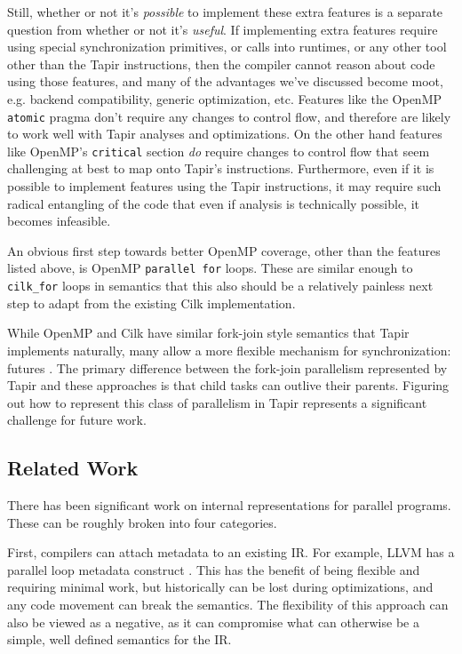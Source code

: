 \documentclass[sigconf]{acmart}
\begin{document}
Still, whether or not it's \emph{possible} to implement these extra features
is a separate question from whether or not it's \emph{useful}. If implementing
extra features require using special synchronization primitives, or calls into
runtimes, or any other tool other than the Tapir instructions, then the
compiler cannot reason about code using those features, and many of the
advantages we've discussed become moot, e.g. backend compatibility, generic 
optimization, etc. Features like the OpenMP \texttt{atomic} pragma don't 
require any changes to control flow, and therefore are likely to work well 
with Tapir analyses and optimizations. On the other hand features like OpenMP's
\texttt{critical} section \emph{do} require changes to control flow that seem
challenging at best to map onto Tapir's instructions. Furthermore, even if it
is possible to implement features using the Tapir instructions, it may require 
such radical entangling of the code that even if analysis is technically
possible, it becomes infeasible. 

An obvious first step towards better OpenMP coverage, other than the features
listed above, is OpenMP \texttt{parallel for} loops. These are similar enough
to \texttt{cilk\_for} loops in semantics that this also should be a relatively
painless next step to adapt from the existing Cilk implementation. 

While OpenMP and Cilk have similar fork-join style semantics that Tapir
implements naturally, many allow a more flexible mechanism for synchronization:
futures \cite{qthreads, chapel, hpx}. The primary difference between the
fork-join parallelism represented by Tapir and these approaches is that
child tasks can outlive their parents. Figuring out how to represent this class
of parallelism in Tapir represents a significant challenge for future work.

\subsection{Related Work} \label{Sec:Related}

There has been significant work on internal representations for parallel
programs. These can be roughly broken into four categories. 

First, compilers can attach metadata to an existing IR. For example, LLVM has a
parallel loop metadata construct \cite{}. This has the benefit of being
flexible and requiring minimal work, but historically can be lost during
optimizations, and any code movement can break the semantics. The flexibility
of this approach can also be viewed as a negative, as it can compromise
what can otherwise be a simple, well defined semantics for the IR. 
\end{document}

